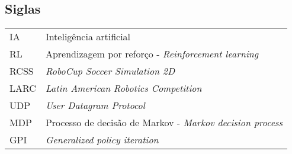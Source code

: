 \subsection*{Siglas}

\begin{tabular}{p{}p{}}
IA  & Inteligência artificial\tabularnewline
RL & Aprendizagem por reforço - \textit{Reinforcement learning} \tabularnewline
RCSS & \textit{RoboCup Soccer Simulation 2D}\tabularnewline
LARC & \textit{Latin American Robotics Competition} \tabularnewline
UDP & \textit{User Datagram Protocol}\tabularnewline
MDP & Processo de decisão de Markov - \textit{Markov decision process}\tabularnewline
GPI & \textit{Generalized policy iteration} \tabularnewline

\end{tabular}

